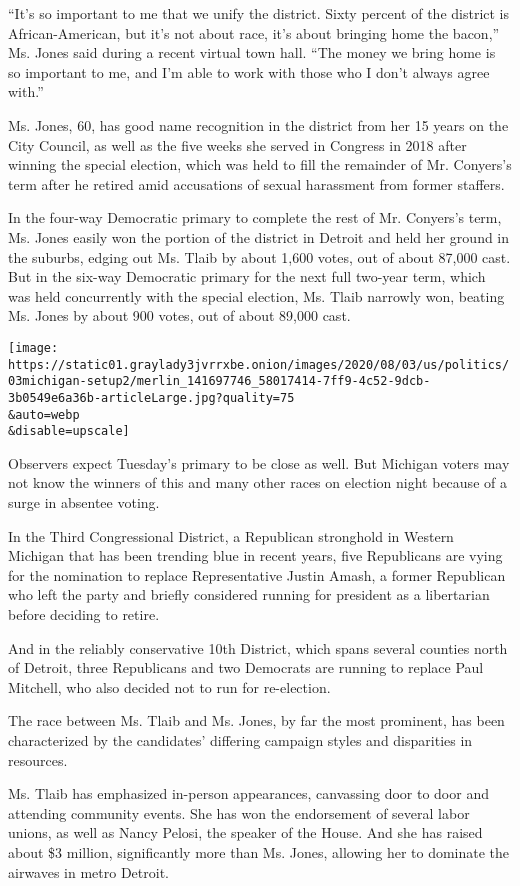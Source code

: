``It's so important to me that we unify the district. Sixty percent of
the district is African-American, but it's not about race, it's about
bringing home the bacon,'' Ms. Jones said during a recent virtual town
hall. ``The money we bring home is so important to me, and I'm able to
work with those who I don't always agree with.''

Ms. Jones, 60, has good name recognition in the district from her 15
years on the City Council, as well as the five weeks she served in
Congress in 2018 after winning the special election, which was held to
fill the remainder of Mr. Conyers's term after he retired amid
accusations of sexual harassment from former staffers.

In the four-way Democratic primary to complete the rest of Mr. Conyers's
term, Ms. Jones easily won the portion of the district in Detroit and
held her ground in the suburbs, edging out Ms. Tlaib by about 1,600
votes, out of about 87,000 cast. But in the six-way Democratic primary
for the next full two-year term, which was held concurrently with the
special election, Ms. Tlaib narrowly won, beating Ms. Jones by about 900
votes, out of about 89,000 cast.

\texttt{[image: https://static01.graylady3jvrrxbe.onion/images/2020/08/03/us/politics/03michigan-setup2/merlin\_141697746\_58017414-7ff9-4c52-9dcb-3b0549e6a36b-articleLarge.jpg?quality=75\\\&auto=webp\\\&disable=upscale]}

Observers expect Tuesday's primary to be close as well. But Michigan
voters may not know the winners of this and many other races on election
night because of a surge in absentee voting.

In the Third Congressional District, a Republican stronghold in Western
Michigan that has been trending blue in recent years, five Republicans
are vying for the nomination to replace Representative Justin Amash, a
former Republican who left the party and briefly considered running for
president as a libertarian before deciding to retire.

And in the reliably conservative 10th District, which spans several
counties north of Detroit, three Republicans and two Democrats are
running to replace Paul Mitchell, who also decided not to run for
re-election.

The race between Ms. Tlaib and Ms. Jones, by far the most prominent, has
been characterized by the candidates' differing campaign styles and
disparities in resources.

Ms. Tlaib has emphasized in-person appearances, canvassing door to door
and attending community events. She has won the endorsement of several
labor unions, as well as Nancy Pelosi, the speaker of the House. And she
has raised about \$3 million, significantly more than Ms. Jones,
allowing her to dominate the airwaves in metro Detroit.

